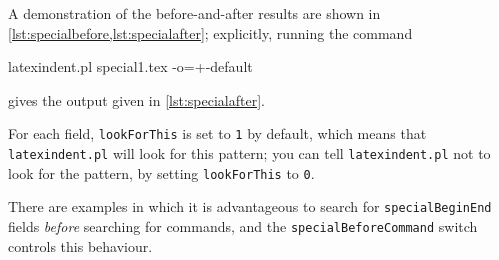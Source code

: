  \begin{example}
 A demonstration of the before-and-after results are shown in
 \cref{lst:specialbefore,lst:specialafter}; explicitly, running the command

 \begin{commandshell}
latexindent.pl special1.tex -o=+-default
 \end{commandshell}

 gives the output given in \cref{lst:specialafter}.

 \begin{cmhtcbraster}
 \end{cmhtcbraster}
 \end{example}

 For each field, \texttt{lookForThis} is set to \texttt{1} by default, which means that
 \texttt{latexindent.pl} will look for this pattern; you can tell \texttt{latexindent.pl}
 not to look for the pattern, by setting \texttt{lookForThis} to \texttt{0}.

 There are  examples in which it is
 advantageous to search for \texttt{specialBeginEnd} fields \emph{before} searching for
 commands, and the \texttt{specialBeforeCommand} switch controls this behaviour.

